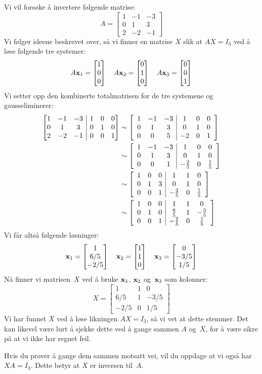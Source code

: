 \begin{ex}
\label{ex:invertering}
Vi vil forsøke å invertere følgende matrise:
\[
A =
\begin{bmatrix}
1 & -1 & -3 \\
0 &  1 &  3 \\
2 & -2 & -1
\end{bmatrix}
\]
Vi følger ideene beskrevet over, så vi finner en matrise $X$ slik at
$AX = I_3$ ved å løse følgende tre systemer:
\[
A \mathbf{x}_1 = \begin{bmatrix} 1 \\ 0 \\ 0 \end{bmatrix}
\quad
A \mathbf{x}_2 = \begin{bmatrix} 0 \\ 1 \\ 0 \end{bmatrix}
\quad
A \mathbf{x}_3 = \begin{bmatrix} 0 \\ 0 \\ 1 \end{bmatrix}
\]
Vi setter opp den kombinerte totalmatrisen for de tre systemene og
gausseliminerer:
\begin{align*}
\left[
\begin{array}{@{}ccc|ccc@{}}
1 & -1 & -3 & 1 & 0 & 0 \\
0 & 1 & 3 & 0 & 1 & 0 \\
2 & -2 & -1 & 0 & 0 & 1
\end{array}
\right]
&
\roweq
\left[
\begin{array}{ccc|ccc}
1 & -1 & -3 & 1 & 0 & 0 \\
0 & 1 & 3 & 0 & 1 & 0 \\
0 & 0 & 5 & -2 & 0 & 1
\end{array}
\right]
\\
&\roweq
\left[
\begin{array}{ccc|ccc}
1 & -1 & -3 & 1 & 0 & 0 \\
0 & 1 & 3 & 0 & 1 & 0 \\
0 & 0 & 1 & -\frac{2}{5} & 0 & \frac{1}{5}
\end{array}
\right]
\\
&\roweq
\left[
\begin{array}{ccc|ccc}
1 & 0 & 0 & 1 & 1 & 0 \\
0 & 1 & 3 & 0 & 1 & 0 \\
0 & 0 & 1 & -\frac{2}{5} & 0 & \frac{1}{5}
\end{array}
\right]
\\
&\roweq
\left[
\begin{array}{ccc|ccc}
1 & 0 & 0 & 1 & 1 & 0 \\
0 & 1 & 0 & \frac{6}{5} & 1 & -\frac{3}{5} \\
0 & 0 & 1 & -\frac{2}{5} & 0 & \frac{1}{5}
\end{array}
\right]
\end{align*}
Vi får altså følgende løsninger:
\[
\mathbf{x}_1 = \begin{bmatrix} 1 \\ 6/5 \\ -2/5 \end{bmatrix}
\quad
\mathbf{x}_2 = \begin{bmatrix} 1 \\ 1 \\ 0 \end{bmatrix}
\quad
\mathbf{x}_3 = \begin{bmatrix} 0 \\ -3/5 \\ 1/5 \end{bmatrix}
\]
Nå finner vi matrisen~$X$ ved å bruke $\mathbf{x}_1$, $\mathbf{x}_2$
og~$\mathbf{x}_3$ som kolonner:
\[
X =
\begin{bmatrix}
1 & 1 & 0 \\
6/5 & 1 & -3/5 \\
-2/5 & 0 & 1/5
\end{bmatrix}
\]
Vi har funnet $X$ ved å løse likningen $AX = I_3$, så vi vet at dette
stemmer.  Det kan likevel være lurt å sjekke dette ved å gange sammen
$A$ og~$X$, for å være sikre på at vi ikke har regnet feil.

Hvis du prøver å gange dem sammen motsatt vei, vil du oppdage at vi
også har $XA = I_3$.  Dette betyr at $X$ er inversen til~$A$.
\end{ex}


